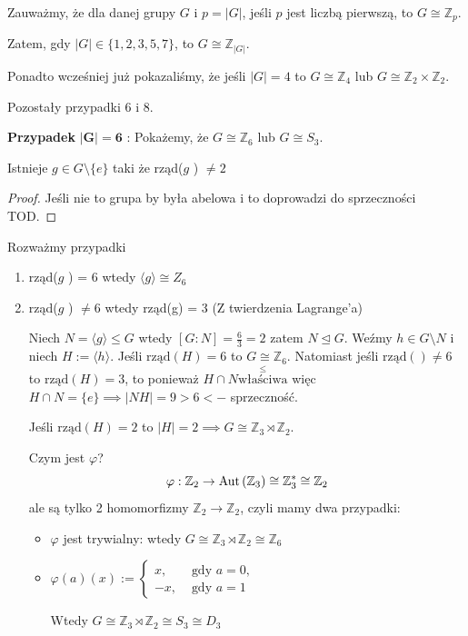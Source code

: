 Zauważmy, że dla danej grupy $G$ i $p = \left| G \right|$, jeśli $p$ jest liczbą pierwszą, to $G\cong\mathbb{Z}_{p}$.

Zatem, gdy $\left| G \right| \in \{1,2,3,5,7\} $, to $G\cong\mathbb{Z}_{\left| G \right| }$.

Ponadto wcześniej już pokazaliśmy, że jeśli $\left| G \right| = 4$ to $G\cong\mathbb{Z}_{4}$ lub $G\cong \mathbb{Z}_2\times \mathbb{Z}_2$.

Pozostały przypadki 6 i 8.

\textbf{Przypadek} $\bm{ \left| G \right| = 6 } $ : Pokażemy, że $G\cong\mathbb{Z}_6$ lub $G\cong S_{3}$.
\begin{fact}
Istnieje $g\in G\setminus \{e\} $ taki że rząd($g$ ) $\neq 2$
\end{fact}
\begin{proof}
	Jeśli nie to grupa by była abelowa i to doprowadzi do sprzeczności TOD. 
\end{proof} 
Rozważmy przypadki
\begin{enumerate}[label=\arabic*.]
	\item rząd($g$ ) = 6 wtedy $\langle g \rangle \cong Z_{6}$ 
	\item rząd($g$ ) $\neq 6$ wtedy rząd(g) = 3 (Z twierdzenia Lagrange'a)
	
		Niech $N= \langle g \rangle \le G$ wtedy $[G:N] = \frac{6}{3}=2$ zatem $N\unlhd G.$ Weźmy $h\in G\setminus N$ i niech $H := \langle h \rangle $. Jeśli $\text{rząd}\left( H \right) = 6$ to $G\cong\mathbb{Z}_6$. Natomiast jeśli $\text{rząd}\left(  \right) \neq 6$ to $\text{rząd}\left( H \right) =3$, to ponieważ $H\cap N \overset{\le }{\text{właściwa}}$ więc $H\cap N= \{e\} \implies \left| NH \right| =9 > 6 <-$ sprzeczność.

		Jeśli $\text{rząd}\left( H \right) = 2$ to $\left| H \right| = 2 \implies G\cong \mathbb{Z}_3\rtimes\mathbb{Z}_2$.

		Czym jest $\varphi$? \[
		\varphi : \mathbb{Z}_2 \to \operatorname{Aut}\left(\mathbb{Z}_3\right) \cong \mathbb{Z}_3^{*} \cong \mathbb{Z}_2
		\] 
                ale są tylko 2 homomorfizmy $\mathbb{Z}_2\to \mathbb{Z}_2$, czyli mamy dwa przypadki:
		\begin{itemize}
			\item $\varphi $ jest trywialny: wtedy $G\cong \mathbb{Z}_3\rtimes\mathbb{Z}_2 \cong\mathbb{Z}_6$
			\item $\varphi\left( a \right) \left( x \right) := \begin{cases}
					x, &\text{ gdy } a= 0,\\
					-x, &\text{ gdy } a=1
			\end{cases}$ 

			Wtedy $G\cong \mathbb{Z}_3\rtimes\mathbb{Z}_2 \cong S_{3} \cong D_{3}$
		\end{itemize}
\end{enumerate}

